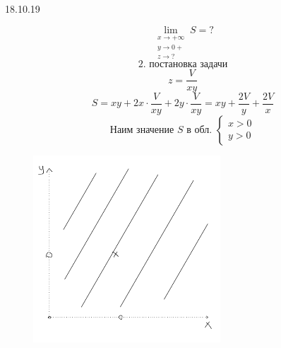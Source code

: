 \documentclass[matan.tex]{subfiles}
\begin{document}
\begin{lect}{18.10.19}
\begin{task}[2]
\begin{figure}[H]
            \centering
        \end{figure}
        \[\lim_{\begin{matrix}
            x \to +\infty\\
            y \to 0+\\
            z \to ?
        \end{matrix}} S = ?\]
        \[2. \text{ постановка задачи}\]
        \[z = \frac{V}{xy}\]
        \[S = xy + 2x \cdot \frac{V}{xy} + 2y \cdot \frac{V}{xy} = 
        xy + \frac{2V}{y} + \frac{2V}{x}\]
        \[\text{Наим значение } S \text{ в обл. } \begin{cases}
            x > 0\\
            y > 0
        \end{cases}\]
        \begin{figure}[H]
            \includegraphics[width=7cm]{pics/12}
            \centering
        \end{figure}
        

\end{task}
\end{lect}
\end{document}
